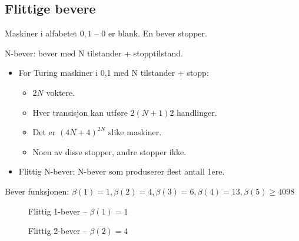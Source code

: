 \documentclass[11pt,a4paper]{article}
\begin{document}
\subsection{Flittige bevere}
Maskiner i alfabetet $0,1$ -- 0 er blank. En bever stopper. 

N-bever: bever med N tilstander + stopptilstand.
\begin{itemize}
\item{For Turing maskiner i 0,1 med N tilstander + stopp:}
\begin{itemize}
\item{$2N$ voktere.}
\item{Hver transisjon kan utføre $2(N+1)2$ handlinger.}
\item{Det er $(4N + 4)^{2N}$ slike maskiner.}
\item{Noen av disse stopper, andre stopper ikke.}
\end{itemize}
\item{Flittig N-bever: N-bever som produserer flest antall 1ere.}
\end{itemize}

Bever funksjonen: $\beta(1) = 1, \beta(2) = 4, \beta(3) = 6, \beta(4) = 13, \beta(5) \geq 4098$

\begin{figure}[h!]
\centering
{}
\caption{Flittig 1-bever -- $\beta(1) = 1$}
\end{figure}

\begin{figure}[h!]
\centering
{}
\caption{Flittig 2-bever -- $\beta(2) = 4$}
\end{figure}
\end{document}
